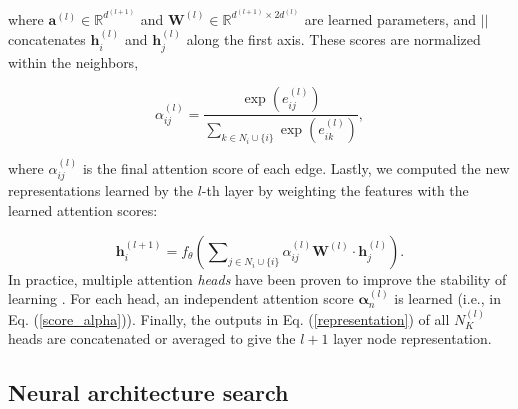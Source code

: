 \documentclass[a4paper,fleqn]{cas-sc}
\begin{document}
where $\mathbf{a}^{(l)} \in \mathbb{R}^{d^{(l+1)}}$ and $\mathbf{W}^{(l)} \in \mathbb{R}^{d^{(l+1)} \times 2d^{(l)}}$ are learned parameters, and $||$ concatenates $\mathbf{h}_{i}^{(l)}$ and $\mathbf{h}_{j}^{(l)}$ along the first axis. These scores are normalized within the neighbors,

\begin{equation} \label{score_alpha}
    \alpha_{ij}^{(l)} = \frac{\exp\left(e_{ij}^{(l)}\right)}{\sum_{k \in N_i\cup\{i\}} \exp\left(e_{ik}^{(l)}\right)},
\end{equation}

where $\alpha_{ij}^{(l)}$ is the final attention score of each edge. Lastly, we computed the new representations learned by the $l$-th layer by weighting the features with the learned attention scores: 

\begin{equation} \label{representation}
    \textbf{h}_{i}^{(l+1)} = f_{\theta}\left( \sum\nolimits_{j \in N_i \cup\{i\}} \alpha_{ij}^{(l)} \mathbf{W}^{(l)} \cdot \mathbf{h}_{j}^{(l)} \right).
\end{equation}
In practice, multiple attention \textit{heads} have been proven to improve the stability of learning \cite{velickovic2018graph,brody2021gatv2}. For each head, an independent attention score $\bm{\alpha}_n^{(l)}$ is learned (i.e., in Eq. (\ref{score_alpha})). Finally, the outputs in Eq. (\ref{representation}) of all $N_K^{(l)}$ heads are concatenated or averaged to give the $l+1$ layer node representation.

\subsection{Neural architecture search}
\end{document}
